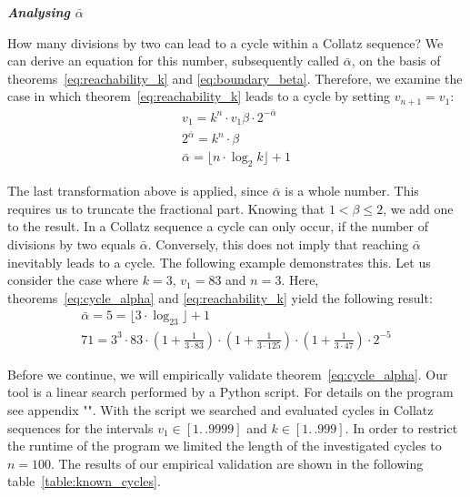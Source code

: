 \documentclass{SciPress_2015}
\renewcommand{\subsection}[1]{\textit{\textbf{#1}}}
\begin{document}
\vspace{1em}\noindent
\subsection{Analysing \boldmath$\bar\alpha$}
\par\noindent
How many divisions by two can lead to a cycle within a Collatz sequence? We can derive an equation for this number, subsequently called $\bar\alpha$, on the basis of theorems~\ref{eq:reachability_k} and \ref{eq:boundary_beta}. Therefore, we examine the case in which theorem~\ref{eq:reachability_k} leads to a cycle by setting  $v_{n+1}=v_1$:
\begin{equation}
\label{eq:cycle_alpha}
\begin{array}{c}
v_1=k^n\cdot v_1\beta\cdot2^{-\bar\alpha}\\
2^{\bar\alpha}=k^n\cdot\beta\\
\bar\alpha=\lfloor n\cdot\log_2k\rfloor+1
\end{array}
\end{equation}

\par\medskip
The last transformation above is applied, since $\bar\alpha$ is a whole number. This requires us to truncate the fractional part. Knowing that $1<\beta\le2$, we add one to the result. In a Collatz sequence a cycle can only occur, if the number of divisions by two equals $\bar\alpha$. Conversely, this does not imply that reaching $\bar\alpha$ inevitably leads to a cycle. The following example demonstrates this. Let us consider the case where $k=3$, $v_1=83$ and $n=3$. Here, theorems~\ref{eq:cycle_alpha} and \ref{eq:reachability_k} yield the following result:
\[
\begin{array}{c}
\bar\alpha=5=\lfloor3\cdot\log_23\rfloor+1\\
71=3^3\cdot83\cdot\left(1+\frac{1}{3\cdot83}\right)\cdot\left(1+\frac{1}{3\cdot125}\right)\cdot\left(1+\frac{1}{3\cdot47}\right)\cdot2^{-5}
\end{array}
\]

\par\medskip
Before we continue, we will empirically validate theorem~\ref{eq:cycle_alpha}. Our tool is a linear search performed by a Python script. For details on the program see appendix "". With the script we searched and evaluated cycles in Collatz sequences for the intervals $v_1\in[1\mathrel{{.}\,{.}}9999]$ and $k\in[1\mathrel{{.}\,{.}}999]$. In order to restrict the runtime of the program we limited the length of the investigated cycles to $n=100$. The results of our empirical validation are shown in the following table~\ref{table:known_cycles}.
\end{document}
